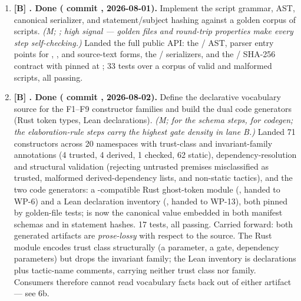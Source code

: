 \begin{enumerate}[leftmargin=2.2em, itemsep=0.35em]
  deliberately, per ). WP-4
  () is now implemented; see item 4.
\item \textbf{[B] . \textbf{Done}
  ( commit , 2026-08-01).} Implement the
  script grammar, AST, canonical serializer, and statement/subject
  hashing against a golden corpus of scripts.
  \emph{(M; ; high signal --- golden files and
  round-trip properties make every step self-checking.)}
  Landed the full public API: the / AST,
  parser entry points for , , and
  source-text forms, the /%
   serializers, and the
  / SHA-256 contract with
   pinned at ; 33 tests over a
  corpus of valid and malformed  scripts, all passing.
\item \textbf{[B] . \textbf{Done}
  ( commit , 2026-08-02).} Define the
  declarative vocabulary source for the F1--F9 constructor families and
  build the dual code generators (Rust token types, Lean declarations).
  \emph{(M;  for the schema steps,  for
  codegen; the elaboration-rule steps carry the highest gate density
  in lane B.)}
  Landed 71 constructors across 20 namespaces with trust-class and
  invariant-family annotations (4 trusted, 4 derived, 1 checked, 62
  static), dependency-resolution and structural
  validation (rejecting untrusted premises misclassified as trusted,
  malformed derived-dependency lists, and non-static tactics), and the
  two code generators: a -compatible Rust ghost-token
  module (, handed to WP-6) and a Lean
  declaration inventory (, handed to
  WP-13), both pinned by golden-file tests; 
  is now the canonical value embedded in both manifest schemas and in
  statement hashes. 17 tests, all passing. Carried forward: both
  generated artifacts are \emph{prose-lossy} with respect to the
  source. The Rust module encodes trust class structurally (a
   parameter, a  gate, dependency
  parameters) but drops the invariant family; the Lean inventory is
   declarations plus tactic-name comments,
  carrying neither trust class nor family. Consumers therefore cannot
  read vocabulary facts back out of either artifact --- see 6b.

\end{enumerate}
